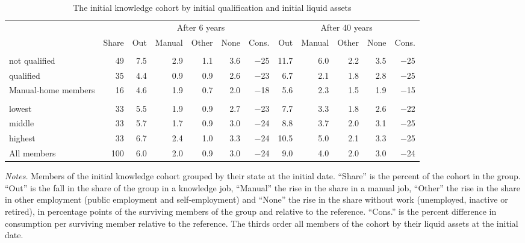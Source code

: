 \begin{table}[htbp]\centering\small\setlength{\tabcolsep}{3.0pt}
\caption{The initial knowledge cohort by initial qualification and initial liquid assets}\label{tab:groups}
\begin{tabularx}{\linewidth}{@{}>{\raggedright\arraybackslash}Xr@{\hspace{0.9em}}rrrrr@{\hspace{0.9em}}rrrrr@{}}\toprule
 &  & \multicolumn{5}{c}{After 6 years} & \multicolumn{5}{c}{After 40 years} \\\cmidrule(lr){3-7}\cmidrule(l){8-12}
 & Share & Out & Manual & Other & None & Cons. & Out & Manual & Other & None & Cons. \\
\midrule \multicolumn{12}{@{}l}{Knowledge-home members, by qualification for manual work} \\
\quad not qualified & 49 & 7.5 & 2.9 & 1.1 & 3.6 & $-$25 & 11.7 & 6.0 & 2.2 & 3.5 & $-$25 \\
\quad qualified & 35 & 4.4 & 0.9 & 0.9 & 2.6 & $-$23 & 6.7 & 2.1 & 1.8 & 2.8 & $-$25 \\
Manual-home members & 16 & 4.6 & 1.9 & 0.7 & 2.0 & $-$18 & 5.6 & 2.3 & 1.5 & 1.9 & $-$15 \\
\multicolumn{12}{@{}l}{Thirds of the cohort by initial liquid assets} \\
\quad lowest & 33 & 5.5 & 1.9 & 0.9 & 2.7 & $-$23 & 7.7 & 3.3 & 1.8 & 2.6 & $-$22 \\
\quad middle & 33 & 5.7 & 1.7 & 0.9 & 3.0 & $-$24 & 8.8 & 3.7 & 2.0 & 3.1 & $-$25 \\
\quad highest & 33 & 6.7 & 2.4 & 1.0 & 3.3 & $-$24 & 10.5 & 5.0 & 2.1 & 3.3 & $-$25 \\
All members & 100 & 6.0 & 2.0 & 0.9 & 3.0 & $-$24 & 9.0 & 4.0 & 2.0 & 3.0 & $-$24 \\
\bottomrule\end{tabularx}
\par\smallskip\begin{minipage}{\linewidth}\footnotesize\emph{Notes.} Members of the initial knowledge cohort grouped by their state at the initial date. ``Share'' is the percent of the cohort in the group. ``Out'' is the fall in the share of the group in a knowledge job, ``Manual'' the rise in the share in a manual job, ``Other'' the rise in the share in other employment (public employment and self-employment) and ``None'' the rise in the share without work (unemployed, inactive or retired), in percentage points of the surviving members of the group and relative to the reference. ``Cons.'' is the percent difference in consumption per surviving member relative to the reference. The thirds order all members of the cohort by their liquid assets at the initial date.\end{minipage}
\end{table}
